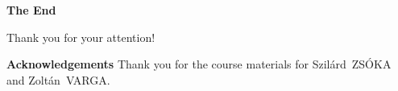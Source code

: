 \documentclass[t,aspectratio=169]{beamer}
\begin{document}

\begin{frame}

\vfill
\begin{center}
\textbf{\huge The End}

\bigskip
Thank you for your attention!
\end{center}
\vfill
\textbf{Acknowledgements} Thank you for the course materials for Szilárd~ZSÓKA and Zoltán~VARGA.
\end{frame}
\end{document}
